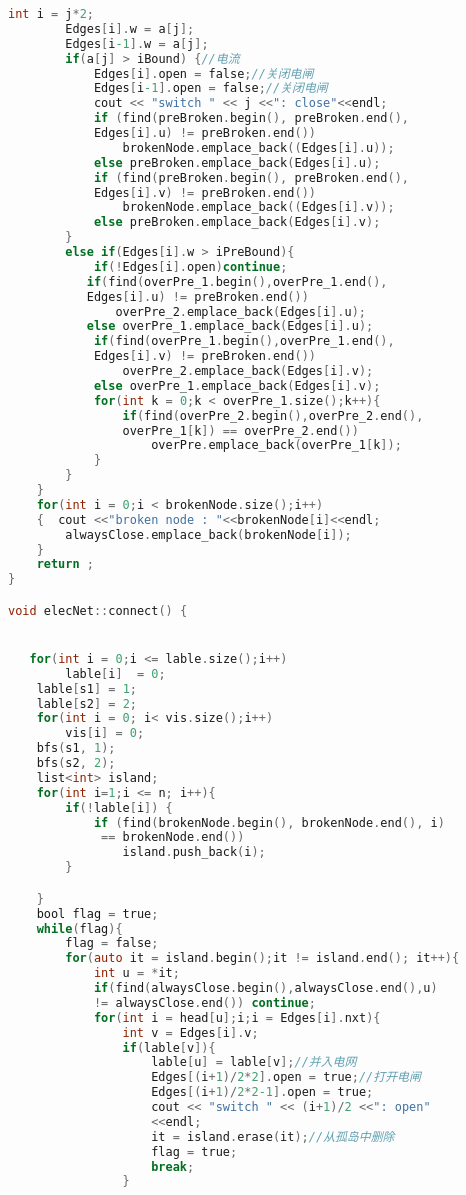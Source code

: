 \documentclass[withoutpreface,bwprint]{cumcmthesis} %
\begin{document}
\begin{appendices}
\begin{lstlisting}[language=C]
        int i = j*2;
        Edges[i].w = a[j];
        Edges[i-1].w = a[j];
        if(a[j] > iBound) {//电流
            Edges[i].open = false;//关闭电闸
            Edges[i-1].open = false;//关闭电闸
            cout << "switch " << j <<": close"<<endl;
            if (find(preBroken.begin(), preBroken.end(),
            Edges[i].u) != preBroken.end())
                brokenNode.emplace_back((Edges[i].u));
            else preBroken.emplace_back(Edges[i].u);
            if (find(preBroken.begin(), preBroken.end(),
            Edges[i].v) != preBroken.end())
                brokenNode.emplace_back((Edges[i].v));
            else preBroken.emplace_back(Edges[i].v);
        }
        else if(Edges[i].w > iPreBound){
            if(!Edges[i].open)continue;
           if(find(overPre_1.begin(),overPre_1.end(),
           Edges[i].u) != preBroken.end())
               overPre_2.emplace_back(Edges[i].u);
           else overPre_1.emplace_back(Edges[i].u);
            if(find(overPre_1.begin(),overPre_1.end(),
            Edges[i].v) != preBroken.end())
                overPre_2.emplace_back(Edges[i].v);
            else overPre_1.emplace_back(Edges[i].v);
            for(int k = 0;k < overPre_1.size();k++){
                if(find(overPre_2.begin(),overPre_2.end(),
                overPre_1[k]) == overPre_2.end())
                    overPre.emplace_back(overPre_1[k]);
            }
        }
    }
    for(int i = 0;i < brokenNode.size();i++)
    {  cout <<"broken node : "<<brokenNode[i]<<endl;
        alwaysClose.emplace_back(brokenNode[i]);
    }
    return ;
}

void elecNet::connect() {


   for(int i = 0;i <= lable.size();i++)
        lable[i]  = 0;
    lable[s1] = 1;
    lable[s2] = 2;
    for(int i = 0; i< vis.size();i++)
        vis[i] = 0;
    bfs(s1, 1);
    bfs(s2, 2);
    list<int> island;
    for(int i=1;i <= n; i++){
        if(!lable[i]) {
            if (find(brokenNode.begin(), brokenNode.end(), i)
             == brokenNode.end())
                island.push_back(i);
        }

    }
    bool flag = true;
    while(flag){
        flag = false;
        for(auto it = island.begin();it != island.end(); it++){
            int u = *it;
            if(find(alwaysClose.begin(),alwaysClose.end(),u)
            != alwaysClose.end()) continue;
            for(int i = head[u];i;i = Edges[i].nxt){
                int v = Edges[i].v;
                if(lable[v]){
                    lable[u] = lable[v];//并入电网
                    Edges[(i+1)/2*2].open = true;//打开电闸
                    Edges[(i+1)/2*2-1].open = true;
                    cout << "switch " << (i+1)/2 <<": open"
                    <<endl;
                    it = island.erase(it);//从孤岛中删除
                    flag = true;
                    break;
                }


\end{lstlisting}
\end{appendices}
\end{document}
